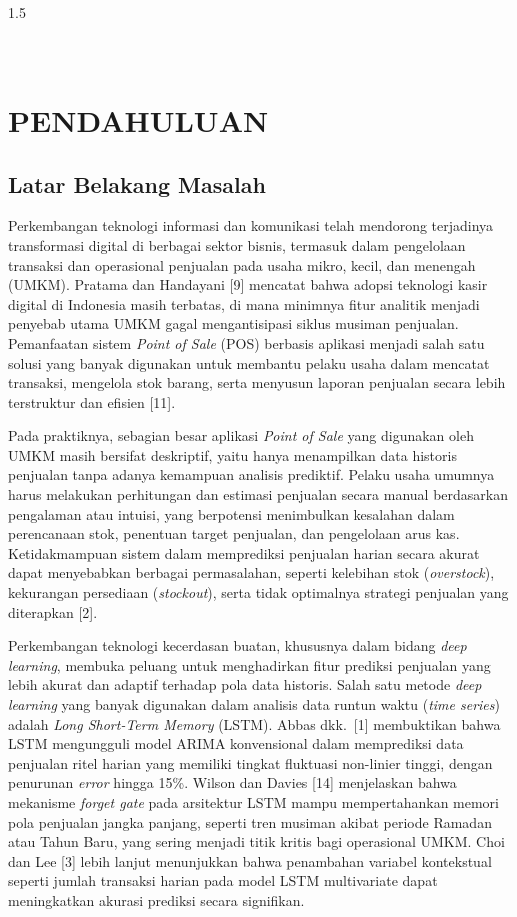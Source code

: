 \documentclass[12pt, a4paper, onecolumn, oneside]{report}
\begin{document}
\begin{spacing}{1.5}

\chapter[PENDAHULUAN]{\\ PENDAHULUAN}

\section{Latar Belakang Masalah}
Perkembangan teknologi informasi dan komunikasi telah mendorong terjadinya transformasi digital di berbagai sektor bisnis, termasuk dalam pengelolaan transaksi dan operasional penjualan pada usaha mikro, kecil, dan menengah (UMKM). Pratama dan Handayani [9] mencatat bahwa adopsi teknologi kasir digital di Indonesia masih terbatas, di mana minimnya fitur analitik menjadi penyebab utama UMKM gagal mengantisipasi siklus musiman penjualan. Pemanfaatan sistem \textit{Point of Sale} (POS) berbasis aplikasi menjadi salah satu solusi yang banyak digunakan untuk membantu pelaku usaha dalam mencatat transaksi, mengelola stok barang, serta menyusun laporan penjualan secara lebih terstruktur dan efisien [11].

Pada praktiknya, sebagian besar aplikasi \textit{Point of Sale} yang digunakan oleh UMKM masih bersifat deskriptif, yaitu hanya menampilkan data historis penjualan tanpa adanya kemampuan analisis prediktif. Pelaku usaha umumnya harus melakukan perhitungan dan estimasi penjualan secara manual berdasarkan pengalaman atau intuisi, yang berpotensi menimbulkan kesalahan dalam perencanaan stok, penentuan target penjualan, dan pengelolaan arus kas. Ketidakmampuan sistem dalam memprediksi penjualan harian secara akurat dapat menyebabkan berbagai permasalahan, seperti kelebihan stok (\textit{overstock}), kekurangan persediaan (\textit{stockout}), serta tidak optimalnya strategi penjualan yang diterapkan [2].

Perkembangan teknologi kecerdasan buatan, khususnya dalam bidang \textit{deep learning}, membuka peluang untuk menghadirkan fitur prediksi penjualan yang lebih akurat dan adaptif terhadap pola data historis. Salah satu metode \textit{deep learning} yang banyak digunakan dalam analisis data runtun waktu (\textit{time series}) adalah \textit{Long Short-Term Memory} (LSTM). Abbas dkk.~[1] membuktikan bahwa LSTM mengungguli model ARIMA konvensional dalam memprediksi data penjualan ritel harian yang memiliki tingkat fluktuasi non-linier tinggi, dengan penurunan \textit{error} hingga 15\%. Wilson dan Davies [14] menjelaskan bahwa mekanisme \textit{forget gate} pada arsitektur LSTM mampu mempertahankan memori pola penjualan jangka panjang, seperti tren musiman akibat periode Ramadan atau Tahun Baru, yang sering menjadi titik kritis bagi operasional UMKM. Choi dan Lee [3] lebih lanjut menunjukkan bahwa penambahan variabel kontekstual seperti jumlah transaksi harian pada model LSTM multivariate dapat meningkatkan akurasi prediksi secara signifikan.


\end{spacing}
\end{document}
